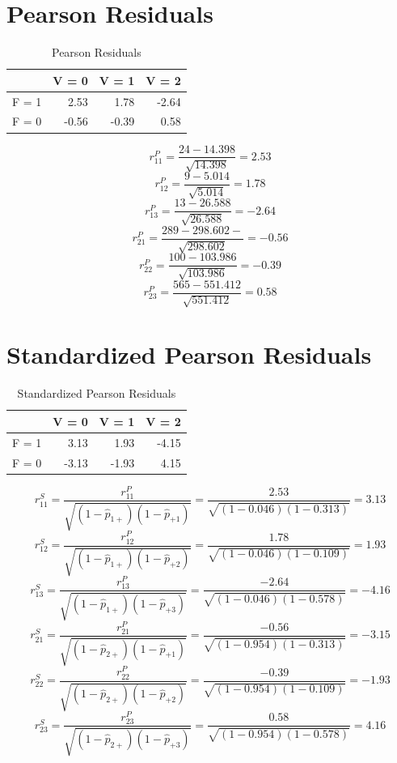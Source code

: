 \documentclass[
]{book}
\begin{document}
\section{Pearson Residuals}\label{pearson-residuals}

\begin{table}

\caption{\label{tab:unnamed-chunk-8}Pearson Residuals}
\centering
\begin{tabular}[t]{l|r|r|r}
\hline
  & V = 0 & V = 1 & V = 2\\
\hline
F = 1 & 2.53 & 1.78 & -2.64\\
\hline
F = 0 & -0.56 & -0.39 & 0.58\\
\hline
\end{tabular}
\end{table}

\[r_{11}^{P} = \frac{24 - 14.398}{\sqrt{14.398}} = 2.53\]
\[r_{12}^{P} = \frac{9 - 5.014}{\sqrt{5.014}} = 1.78\]
\[r_{13}^{P} = \frac{13 - 26.588}{\sqrt{26.588}} = -2.64\]
\[r_{21}^{P} = \frac{289 - 298.602-}{\sqrt{298.602}} = -0.56\]
\[r_{22}^{P} = \frac{100 - 103.986}{\sqrt{103.986}} = -0.39\]
\[r_{23}^{P} = \frac{565 - 551.412}{\sqrt{551.412}} = 0.58\]

\section{Standardized Pearson Residuals}\label{standardized-pearson-residuals}

\begin{table}

\caption{\label{tab:unnamed-chunk-9}Standardized Pearson Residuals}
\centering
\begin{tabular}[t]{l|r|r|r}
\hline
  & V = 0 & V = 1 & V = 2\\
\hline
F = 1 & 3.13 & 1.93 & -4.15\\
\hline
F = 0 & -3.13 & -1.93 & 4.15\\
\hline
\end{tabular}
\end{table}

\[r_{11}^{S} = \frac{r_{11}^{P}} {\sqrt{(1-\hat{p}_{1+})(1-\hat{p}_{+1})}} = \frac{2.53}{\sqrt{(1-0.046)(1-0.313)}} = 3.13\]
\[r_{12}^{S} = \frac{r_{12}^{P}} {\sqrt{(1-\hat{p}_{1+})(1-\hat{p}_{+2})}} = \frac{1.78}{\sqrt{(1-0.046)(1-0.109)}} = 1.93\]
\[r_{13}^{S} = \frac{r_{13}^{P}} {\sqrt{(1-\hat{p}_{1+})(1-\hat{p}_{+3})}} = \frac{-2.64}{\sqrt{(1-0.046)(1-0.578)}} = -4.16\]
\[r_{21}^{S} = \frac{r_{21}^{P}} {\sqrt{(1-\hat{p}_{2+})(1-\hat{p}_{+1})}} = \frac{-0.56}{\sqrt{(1-0.954)(1-0.313)}} = -3.15\]
\[r_{22}^{S} = \frac{r_{22}^{P}} {\sqrt{(1-\hat{p}_{2+})(1-\hat{p}_{+2})}} = \frac{-0.39}{\sqrt{(1-0.954)(1-0.109)}} = -1.93\]
\[r_{23}^{S} = \frac{r_{23}^{P}} {\sqrt{(1-\hat{p}_{2+})(1-\hat{p}_{+3})}} = \frac{0.58}{\sqrt{(1-0.954)(1-0.578)}} = 4.16\]
\end{document}
